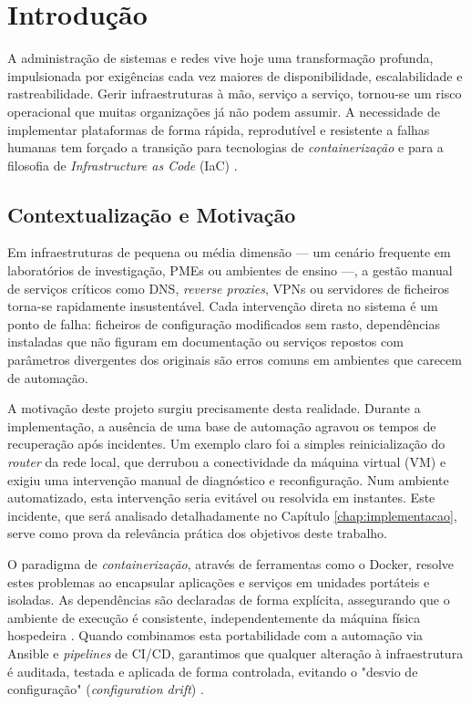 \chapter{Introdução}
\label{chap:introducao}

A administração de sistemas e redes vive hoje uma transformação profunda, impulsionada por exigências cada vez maiores de disponibilidade, escalabilidade e rastreabilidade. Gerir infraestruturas à mão, serviço a serviço, tornou-se um risco operacional que muitas organizações já não podem assumir. A necessidade de implementar plataformas de forma rápida, reprodutível e resistente a falhas humanas tem forçado a transição para tecnologias de \textit{containerização} e para a filosofia de \textit{Infrastructure as Code} (IaC) \cite{morris2016infrastructure}.

\section{Contextualização e Motivação}

Em infraestruturas de pequena ou média dimensão --- um cenário frequente em laboratórios de investigação, PMEs ou ambientes de ensino ---, a gestão manual de serviços críticos como DNS, \textit{reverse proxies}, VPNs ou servidores de ficheiros torna-se rapidamente insustentável. Cada intervenção direta no sistema é um ponto de falha: ficheiros de configuração modificados sem rasto, dependências instaladas que não figuram em documentação ou serviços repostos com parâmetros divergentes dos originais são erros comuns em ambientes que carecem de automação.

A motivação deste projeto surgiu precisamente desta realidade. Durante a implementação, a ausência de uma base de automação agravou os tempos de recuperação após incidentes. Um exemplo claro foi a simples reinicialização do \textit{router} da rede local, que derrubou a conectividade da máquina virtual (VM) e exigiu uma intervenção manual de diagnóstico e reconfiguração. Num ambiente automatizado, esta intervenção seria evitável ou resolvida em instantes. Este incidente, que será analisado detalhadamente no Capítulo \ref{chap:implementacao}, serve como prova da relevância prática dos objetivos deste trabalho.

O paradigma de \textit{containerização}, através de ferramentas como o Docker, resolve estes problemas ao encapsular aplicações e serviços em unidades portáteis e isoladas. As dependências são declaradas de forma explícita, assegurando que o ambiente de execução é consistente, independentemente da máquina física hospedeira \cite{docker_docs}. Quando combinamos esta portabilidade com a automação via Ansible e \textit{pipelines} de CI/CD, garantimos que qualquer alteração à infraestrutura é auditada, testada e aplicada de forma controlada, evitando o "desvio de configuração" (\textit{configuration drift}) \cite{humble2010continuous}.

